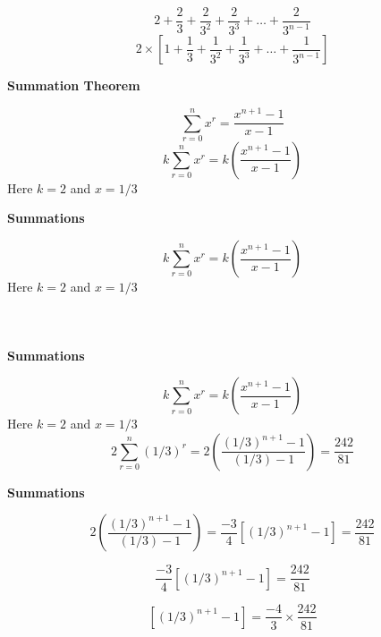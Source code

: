 \documentclass[12pt]{article}
\begin{document}
\[  2 + \frac{2}{3} + \frac{2}{3^2} + \frac{2}{3^3} +  \ldots + \frac{2}{3^{n-1}} \]
\[  2 \times \left[ 1 + \frac{1}{3} + \frac{1}{3^2} + \frac{1}{3^3} +  \ldots + \frac{1}{3^{n-1}}   \right] \]

\textbf{Summation Theorem}

\[ \sum^{n}_{r=0} x^r = \frac{x^{n+1}-1}{x-1} \]
\[ k  \sum^{n}_{r=0} x^r  =  k \left( \frac{x^{n+1}-1}{x-1} \right) \]
Here $k=2$ and $x = 1/3$ 





\noindent\textbf{Summations}


\[ k  \sum^{n}_{r=0} x^r  =  k \left( \frac{x^{n+1}-1}{x-1} \right) \]
Here $k=2$ and $x = 1/3$ 
\[  \phantom{ 2  \sum^{n}_{r=0} (1/3)^r  =  2 \left( \frac{(1/3)^{n+1}-1}{(1/3)-1} \right) } \]





\noindent\textbf{Summations}


\[ k  \sum^{n}_{r=0} x^r  =  k \left( \frac{x^{n+1}-1}{x-1} \right) \]
Here $k=2$ and $x = 1/3$ 
\[  2  \sum^{n}_{r=0} (1/3)^r  =  2 \left( \frac{(1/3)^{n+1}-1}{(1/3)-1} \right)  = \frac{242}{81} \]





\noindent\textbf{Summations}

\[    2 \left( \frac{(1/3)^{n+1}-1}{(1/3)-1} \right)  = \frac{-3}{4} \left[ (1/3)^{n+1}-1 \right]  = \frac{242}{81} \]

\[     \frac{-3}{4} \left[ (1/3)^{n+1}-1 \right]  = \frac{242}{81} \]

\[      \left[ (1/3)^{n+1}-1 \right]  =  \frac{-4}{3} \times \frac{242}{81} \]

\newpage


\pagebreak
\end{document}
